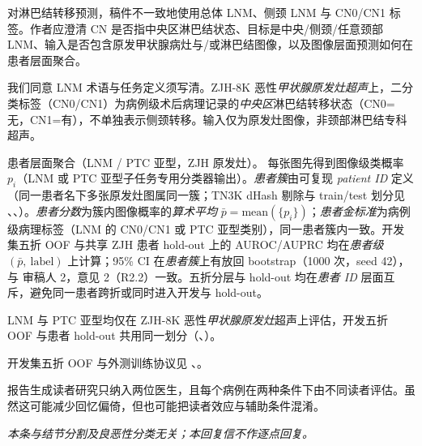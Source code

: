 \begin{reviewercomment}
对淋巴结转移预测，稿件不一致地使用总体 LNM、侧颈 LNM 与 CN0/CN1 标签。作者应澄清 CN 是否指中央区淋巴结状态、目标是中央/侧颈/任意颈部 LNM、输入是否包含原发甲状腺病灶与/或淋巴结图像，以及图像层面预测如何在患者层面聚合。
\end{reviewercomment}
\begin{authorresponse}
我们同意 LNM 术语与任务定义须写清。ZJH-8K 恶性\emph{甲状腺原发灶超声}上，二分类标签（CN0/CN1）为病例级术后病理记录的\emph{中央区}淋巴结转移状态（CN0=无，CN1=有），不单独表示侧颈转移。输入仅为原发灶图像，非颈部淋巴结专科超声。\par
患者层面聚合（LNM / PTC 亚型，ZJH 原发灶）。 每张图先得到图像级类概率 $p_i$（LNM 或 PTC 亚型子任务专用分类器输出）。\emph{患者簇}由可复现 \emph{patient ID} 定义（同一患者名下多张原发灶图属同一簇；TN3K dHash 剔除与 train/test 划分见 、、）。\emph{患者分数}为簇内图像概率的\emph{算术平均} $\bar p=\mathrm{mean}(\{p_i\})$；\emph{患者金标准}为病例级病理标签（LNM 的 CN0/CN1 或 PTC 亚型类别），同一患者簇内一致。开发集五折 OOF 与共享 ZJH 患者 hold-out 上的 AUROC/AUPRC 均在\emph{患者级} $(\bar p,\ \mathrm{label})$ 上计算；95\% CI 在\emph{患者簇}上有放回 bootstrap（1000 次，seed 42），与 审稿人 2，意见 2（R2.2）一致。五折分层与 hold-out 均在\emph{患者 ID} 层面互斥，避免同一患者跨折或同时进入开发与 hold-out。\par
LNM 与 PTC 亚型均仅在 ZJH-8K 恶性\emph{甲状腺原发灶}超声上评估，开发五折 OOF 与患者 hold-out 共用同一划分（、）。\par
开发集五折 OOF 与外测训练协议见 、。\par
\par
\end{authorresponse}

\begin{reviewercomment}
报告生成读者研究只纳入两位医生，且每个病例在两种条件下由不同读者评估。虽然这可能减少回忆偏倚，但也可能把读者效应与辅助条件混淆。
\end{reviewercomment}
\begin{authorresponse}
\noindent\textit{本条与结节分割及良恶性分类无关；本回复信不作逐点回复。}
\end{authorresponse}

